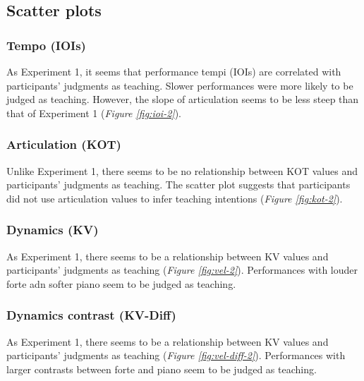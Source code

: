 \documentclass[
  man,floatsintext]{apa6}
\begin{document}
\hypertarget{scatter-plots}{%
\subsection{Scatter plots}\label{scatter-plots}}

\hypertarget{tempo-iois-1}{%
\subsubsection{Tempo (IOIs)}\label{tempo-iois-1}}

As Experiment 1, it seems that performance tempi (IOIs) are correlated with participants' judgments as teaching. Slower performances were more likely to be judged as teaching. However, the slope of articulation seems to be less steep than that of Experiment 1 (\emph{Figure \ref{fig:ioi-2}}).

\hypertarget{articulation-kot-1}{%
\subsubsection{Articulation (KOT)}\label{articulation-kot-1}}

Unlike Experiment 1, there seems to be no relationship between KOT values and participants' judgments as teaching. The scatter plot suggests that participants did not use articulation values to infer teaching intentions (\emph{Figure \ref{fig:kot-2}}).

\hypertarget{dynamics-kv-1}{%
\subsubsection{Dynamics (KV)}\label{dynamics-kv-1}}

As Experiment 1, there seems to be a relationship between KV values and participants' judgments as teaching (\emph{Figure \ref{fig:vel-2}}). Performances with louder forte adn softer piano seem to be judged as teaching.

\hypertarget{dynamics-contrast-kv-diff-1}{%
\subsubsection{Dynamics contrast (KV-Diff)}\label{dynamics-contrast-kv-diff-1}}

As Experiment 1, there seems to be a relationship between KV values and participants' judgments as teaching (\emph{Figure \ref{fig:vel-diff-2}}). Performances with larger contrasts between forte and piano seem to be judged as teaching.
\end{document}
